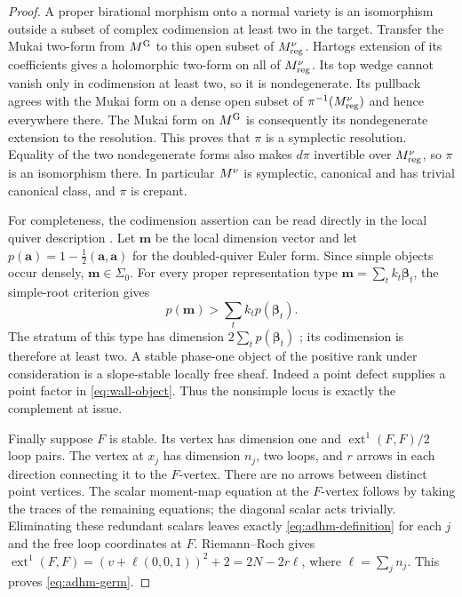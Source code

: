 \begin{proof}
A proper birational morphism onto a normal variety is an isomorphism
outside a subset of complex codimension at least two in the target.
Transfer the Mukai two-form from $M^{\mathrm G}$ to this open subset of
$M^{\nu}_{\rm reg}$. Hartogs extension of its coefficients gives a holomorphic
two-form on all of $M^{\nu}_{\rm reg}$. Its top wedge cannot vanish only in
codimension at least two, so it is nondegenerate. Its pullback agrees with
the Mukai form on a dense open subset of $\pi^{-1}(M^{\nu}_{\rm reg})$ and
hence everywhere there. The Mukai form on $M^{\mathrm G}$ is consequently its
nondegenerate extension to the resolution. This proves that $\pi$ is a
symplectic resolution. Equality of the two nondegenerate forms also makes
$d\pi$ invertible over $M^{\nu}_{\rm reg}$, so $\pi$ is an isomorphism there.
In particular $M^{\nu}$ is symplectic, canonical and has trivial canonical
class, and $\pi$ is crepant.

For completeness, the codimension assertion can be read directly in the
local quiver description \cite[Proposition~3.1 and Corollary~4.1]{AS23}.
Let $\mathbf m$ be the local dimension vector and let
$p(\mathbf a)=1-\frac12(\mathbf a,\mathbf a)$ for the doubled-quiver
Euler form. Since simple objects occur densely, $\mathbf m\in\Sigma_0$.
For every proper representation type
$\mathbf m=\sum_t k_t\boldsymbol\beta_t$, the simple-root criterion gives
\[
 p(\mathbf m)>\sum_t k_t p(\boldsymbol\beta_t).
\]
The stratum of this type has dimension $2\sum_t p(\boldsymbol\beta_t)$
\cite[Theorems~1.2--1.3]{CB01}; its codimension is therefore at least two.
A stable phase-one object of the positive rank under consideration is a slope-stable locally free sheaf. Indeed a point defect supplies
a point factor in \eqref{eq:wall-object}. Thus the nonsimple locus is exactly
the complement at issue.

Finally suppose $F$ is stable. Its vertex has dimension one and
$\operatorname{ext}^1(F,F)/2$ loop pairs. The vertex at $x_j$ has dimension
$n_j$, two loops, and $r$ arrows in each direction connecting it to the
$F$-vertex. There are no arrows between distinct point vertices.
The scalar moment-map equation at the $F$-vertex follows by taking the
traces of the remaining equations; the diagonal scalar acts trivially.
Eliminating these redundant scalars leaves exactly \eqref{eq:adhm-definition}
for each $j$ and the free loop coordinates at $F$. Riemann--Roch gives
$\operatorname{ext}^1(F,F)=(v+\ell(0,0,1))^2+2=2N-2r\ell$,
where $\ell=\sum_jn_j$. This proves \eqref{eq:adhm-germ}.
\end{proof}

